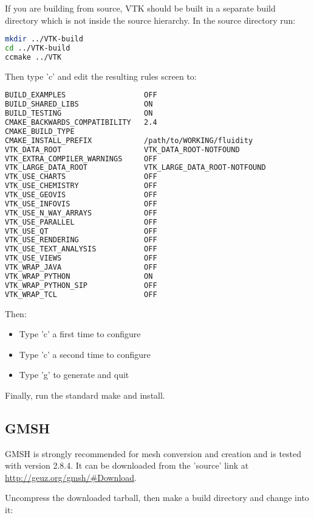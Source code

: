 If you are building from source, VTK should be built in a separate build
directory which is not inside the source hierarchy. In the source directory
run:

\begin{lstlisting}[language=bash]
mkdir ../VTK-build
cd ../VTK-build
ccmake ../VTK
\end{lstlisting}

Then type 'c' and edit the resulting rules screen to:

\begin{lstlisting}[language=bash]
BUILD_EXAMPLES                  OFF
BUILD_SHARED_LIBS               ON
BUILD_TESTING                   ON
CMAKE_BACKWARDS_COMPATIBILITY   2.4
CMAKE_BUILD_TYPE
CMAKE_INSTALL_PREFIX            /path/to/WORKING/fluidity
VTK_DATA_ROOT                   VTK_DATA_ROOT-NOTFOUND
VTK_EXTRA_COMPILER_WARNINGS     OFF
VTK_LARGE_DATA_ROOT             VTK_LARGE_DATA_ROOT-NOTFOUND
VTK_USE_CHARTS                  OFF
VTK_USE_CHEMISTRY               OFF
VTK_USE_GEOVIS                  OFF
VTK_USE_INFOVIS                 OFF
VTK_USE_N_WAY_ARRAYS            OFF
VTK_USE_PARALLEL                OFF
VTK_USE_QT                      OFF 
VTK_USE_RENDERING               OFF
VTK_USE_TEXT_ANALYSIS           OFF
VTK_USE_VIEWS                   OFF
VTK_WRAP_JAVA                   OFF
VTK_WRAP_PYTHON                 ON
VTK_WRAP_PYTHON_SIP             OFF
VTK_WRAP_TCL                    OFF 
\end{lstlisting}

Then:

\begin{itemize}
  \item Type 'c' a first time to configure
  \item Type 'c' a second time to configure
  \item Type 'g' to generate and quit
\end{itemize}

Finally, run the standard make and install.

\subsection{GMSH}
\label{sec:required_libraries_gmsh}

GMSH is strongly recommended for mesh conversion and creation and is tested
with version 2.8.4. It can be downloaded from the 'source' link at 
\url{http://geuz.org/gmsh/#Download}.

Uncompress the downloaded tarball, then make a build directory and change into
it:

